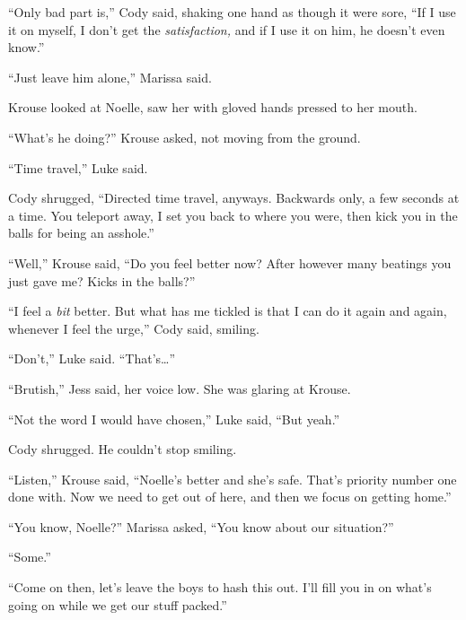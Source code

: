 ``Only bad part is,'' Cody said, shaking one hand as though it were sore, ``If I use it on myself, I don't get the \emph{satisfaction, }and if I use it on him, he doesn't even know.''



``Just leave him alone,'' Marissa said.



Krouse looked at Noelle, saw her with gloved hands pressed to her mouth.



``What's he doing?'' Krouse asked, not moving from the ground.



``Time travel,'' Luke said.



Cody shrugged, ``Directed time travel, anyways.  Backwards only, a few seconds at a time.  You teleport away, I set you back to where you were, then kick you in the balls for being an asshole.''



``Well,'' Krouse said, ``Do you feel better now?  After however many beatings you just gave me?  Kicks in the balls?''



``I feel a \emph{bit} better.  But what has me tickled is that I can do it again and again, whenever I feel the urge,'' Cody said, smiling.



``Don't,'' Luke said.  ``That's\ldots''



``Brutish,'' Jess said, her voice low.  She was glaring at Krouse.



``Not the word I would have chosen,'' Luke said, ``But yeah.''



Cody shrugged.  He couldn't stop smiling.



``Listen,'' Krouse said, ``Noelle's better and she's safe.  That's priority number one done with.  Now we need to get out of here, and then we focus on getting home.''



``You know, Noelle?''  Marissa asked, ``You know about our situation?''



``Some.''



``Come on then, let's leave the boys to hash this out.  I'll fill you in on what's going on while we get our stuff packed.''



